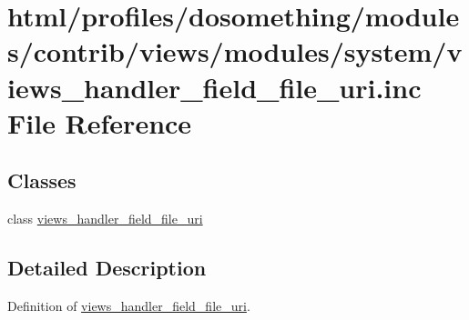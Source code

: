 \hypertarget{views__handler__field__file__uri_8inc}{
\section{html/profiles/dosomething/modules/contrib/views/modules/system/views\_\-handler\_\-field\_\-file\_\-uri.inc File Reference}
\label{views__handler__field__file__uri_8inc}
}
\subsection*{Classes}
\begin{DoxyCompactItemize}
\item 
class \hyperlink{classviews__handler__field__file__uri}{views\_\-handler\_\-field\_\-file\_\-uri}
\end{DoxyCompactItemize}


\subsection{Detailed Description}
Definition of \hyperlink{classviews__handler__field__file__uri}{views\_\-handler\_\-field\_\-file\_\-uri}. 